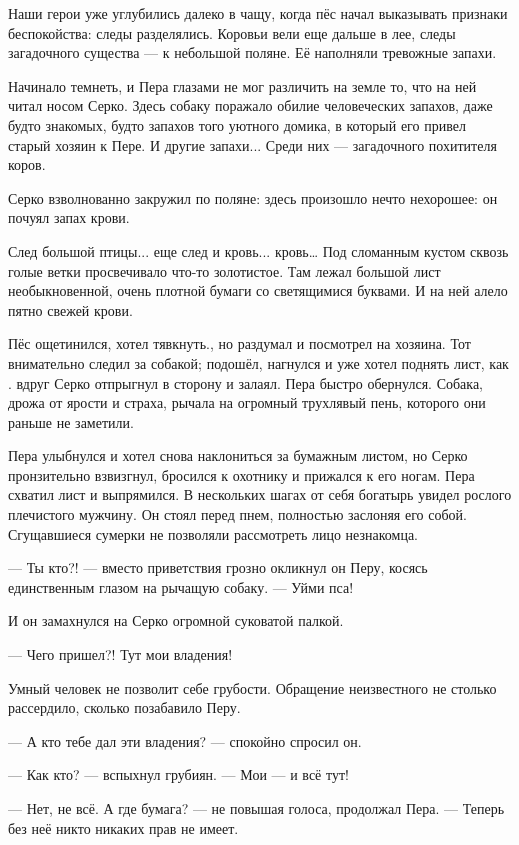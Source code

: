 \documentclass[12pt, a4paper, openany]{book}
\begin{document}
	Наши герои уже углубились далеко в чащу, когда пёс начал выказывать признаки беспокойства: следы разделялись. Коровьи вели еще дальше в лее, следы загадочного существа — к небольшой поляне. Её наполняли тревожные запахи.
	
	Начинало темнеть, и Пера глазами не мог различить на земле то, что на ней читал носом Серко. Здесь собаку поражало обилие человеческих запахов, даже будто знакомых, будто запахов того уютного домика, в который его привел старый хозяин к Пере. И другие запахи... Среди них — загадочного похитителя коров.
	
	Серко взволнованно закружил по поляне: здесь произошло нечто нехорошее: он почуял запах крови.
	
	След большой птицы... еще след и кровь... кровь… Под сломанным кустом сквозь голые ветки просвечивало что-то золотистое. Там лежал большой лист необыкновенной, очень плотной бумаги со светящимися буквами. И на ней алело пятно свежей крови.
	
	Пёс ощетинился, хотел тявкнуть., но раздумал и посмотрел на хозяина. Тот внимательно следил за собакой; подошёл, нагнулся и уже хотел поднять лист, как . вдруг Серко отпрыгнул в сторону и залаял. Пера быстро обернулся. Собака, дрожа от ярости и страха, рычала на огромный трухлявый пень, которого они раньше не заметили.
	
	Пера улыбнулся и хотел снова наклониться за бумажным листом, но Серко пронзительно взвизгнул, бросился к охотнику и прижался к его ногам. Пера схватил лист и выпрямился. В нескольких шагах от себя богатырь увидел рослого плечистого мужчину. Он стоял перед пнем, полностью заслоняя его собой. Сгущавшиеся сумерки не позволяли рассмотреть лицо незнакомца.
	
	— Ты кто?! — вместо приветствия грозно окликнул он Перу, косясь единственным глазом на рычащую собаку. — Уйми пса!
	
	И он замахнулся на Серко огромной суковатой палкой.
	
	— Чего пришел?! Тут мои владения!
	
	Умный человек не позволит себе грубости. Обращение неизвестного не столько рассердило, сколько позабавило Перу.
	
	— А кто тебе дал эти владения? — спокойно спросил он.
	
	— Как кто? — вспыхнул грубиян. — Мои — и всё тут!
	
	— Нет, не всё. А где бумага? — не повышая голоса, продолжал Пера. — Теперь без неё никто никаких прав не имеет.
	
\end{document}
